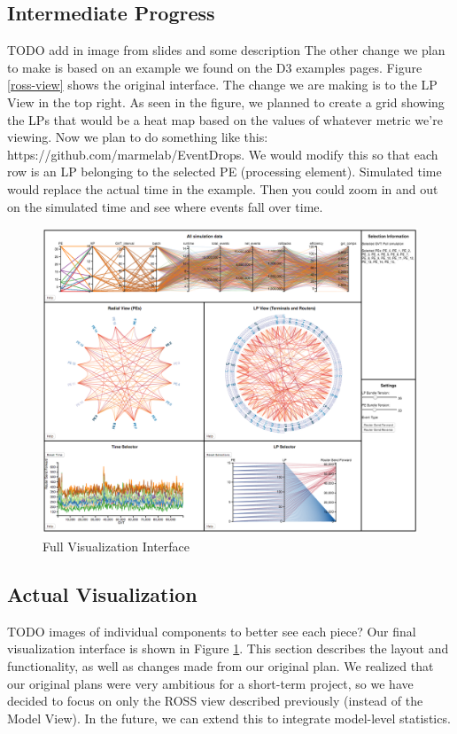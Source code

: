 \documentclass{acm_proc_article-sp}
\begin{document}
\subsection{Intermediate Progress}
\color{red}TODO add in image from slides and some description\color{black}
The other change we plan to make is based on an example we found on the D3 examples pages.  Figure \ref{ross-view} shows the original interface.  The change we are making is to the LP View in the top right.  As seen in the figure, we planned to create a grid showing the LPs that would be a heat map based on the values of whatever metric we're viewing.  Now we plan to do something like this: https://github.com/marmelab/EventDrops.  We would modify this so that each row is an LP belonging to the selected PE (processing element).  Simulated time would replace the actual time in the example.  Then you could zoom in and out on the simulated time and see where events fall over time.


\begin{figure}[t]
\centering
   \includegraphics[width=6.5in]{actual-vis.png}
\caption{Full Visualization Interface}
\label{actual-vis}
\end{figure}

\subsection{Actual Visualization}
\color{red} TODO images of individual components to better see each piece? \color{black}
Our final visualization interface is shown in Figure \ref{actual-vis}.  This section describes the layout and functionality, as well as changes made from our original plan.  We realized that our original plans were very ambitious for a short-term project, so we have decided to focus on only the ROSS view described previously (instead of the Model View).  In the future, we can extend this to integrate model-level statistics.  
\end{document}

